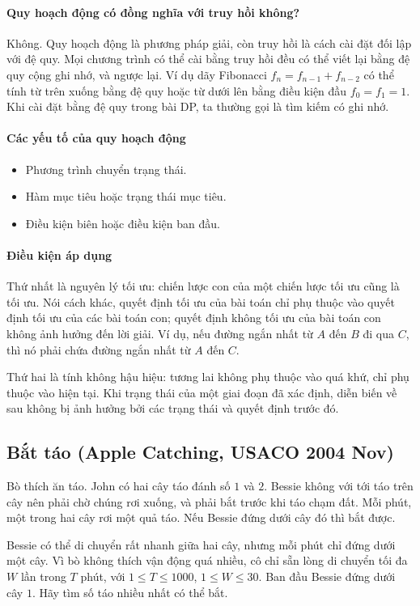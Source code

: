\documentclass[11pt]{article}
\newcommand{\problem}[1]{\subsection{#1}}
\begin{document}
\paragraph{Quy hoạch động có đồng nghĩa với truy hồi không?}
Không. Quy hoạch động là phương pháp giải, còn truy hồi là cách cài đặt đối lập với đệ quy. Mọi chương trình có thể cài bằng truy hồi đều có thể viết lại bằng đệ quy cộng ghi nhớ, và ngược lại. Ví dụ dãy Fibonacci \(f_n=f_{n-1}+f_{n-2}\) có thể tính từ trên xuống bằng đệ quy hoặc từ dưới lên bằng điều kiện đầu \(f_0=f_1=1\). Khi cài đặt bằng đệ quy trong bài DP, ta thường gọi là tìm kiếm có ghi nhớ.

\paragraph{Các yếu tố của quy hoạch động}
\begin{itemize}
  \item Phương trình chuyển trạng thái.
  \item Hàm mục tiêu hoặc trạng thái mục tiêu.
  \item Điều kiện biên hoặc điều kiện ban đầu.
\end{itemize}

\paragraph{Điều kiện áp dụng}
Thứ nhất là nguyên lý tối ưu: chiến lược con của một chiến lược tối ưu cũng là tối ưu. Nói cách khác, quyết định tối ưu của bài toán chỉ phụ thuộc vào quyết định tối ưu của các bài toán con; quyết định không tối ưu của bài toán con không ảnh hưởng đến lời giải. Ví dụ, nếu đường ngắn nhất từ \(A\) đến \(B\) đi qua \(C\), thì nó phải chứa đường ngắn nhất từ \(A\) đến \(C\).

Thứ hai là tính không hậu hiệu: tương lai không phụ thuộc vào quá khứ, chỉ phụ thuộc vào hiện tại. Khi trạng thái của một giai đoạn đã xác định, diễn biến về sau không bị ảnh hưởng bởi các trạng thái và quyết định trước đó.

\problem{Bắt táo (Apple Catching, USACO 2004 Nov)}

Bò thích ăn táo. John có hai cây táo đánh số \(1\) và \(2\). Bessie không với tới táo trên cây nên phải chờ chúng rơi xuống, và phải bắt trước khi táo chạm đất. Mỗi phút, một trong hai cây rơi một quả táo. Nếu Bessie đứng dưới cây đó thì bắt được.

Bessie có thể di chuyển rất nhanh giữa hai cây, nhưng mỗi phút chỉ đứng dưới một cây. Vì bò không thích vận động quá nhiều, cô chỉ sẵn lòng di chuyển tối đa \(W\) lần trong \(T\) phút, với \(1 \le T \le 1000\), \(1 \le W \le 30\). Ban đầu Bessie đứng dưới cây \(1\). Hãy tìm số táo nhiều nhất có thể bắt.
\end{document}
